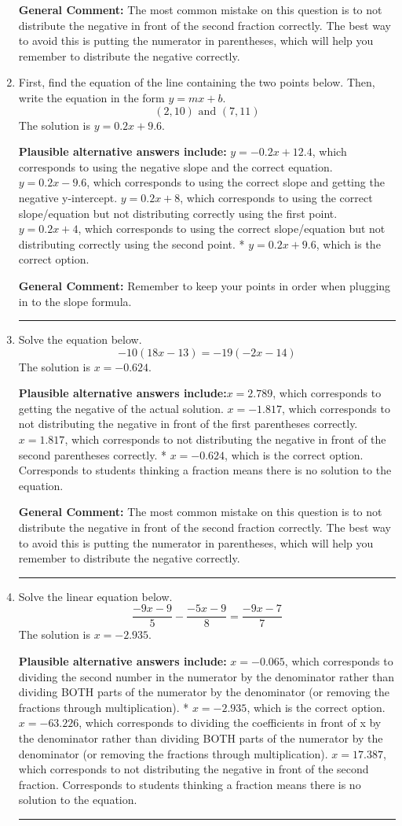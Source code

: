 \documentclass{extbook}[14pt]
\newcommand{\litem}[1]{\item #1

\rule{\textwidth}{0.4pt}}
\begin{document}
\begin{enumerate}
{\textbf{General Comment:} The most common mistake on this question is to not distribute the negative in front of the second fraction correctly. The best way to avoid this is putting the numerator in parentheses, which will help you remember to distribute the negative correctly.
}
\litem{
First, find the equation of the line containing the two points below. Then, write the equation in the form $ y=mx+b $.
\[ (2, 10) \text{ and } (7, 11) \]The solution is \( y = 0.2x + 9.6 \).\begin{enumerate}[label=\Alph*.]
\textbf{Plausible alternative answers include:} $y = -0.2x + 12.4$, which corresponds to using the negative slope and the correct equation.
 $y = 0.2x -9.6$, which corresponds to using the correct slope and getting the negative y-intercept.
 $y = 0.2x + 8$, which corresponds to using the correct slope/equation but not distributing correctly using the first point.
 $y = 0.2x + 4$, which corresponds to using the correct slope/equation but not distributing correctly using the second point.
* $y = 0.2x + 9.6$, which is the correct option.
\end{enumerate}

\textbf{General Comment:} Remember to keep your points in order when plugging in to the slope formula.
}
\litem{
Solve the equation below.
\[ -10(18x -13) = -19(-2x -14) \]The solution is \( x = -0.624 \).\begin{enumerate}[label=\Alph*.]
\textbf{Plausible alternative answers include:}$x = 2.789$, which corresponds to getting the negative of the actual solution.
$x = -1.817$, which corresponds to not distributing the negative in front of the first parentheses correctly.
$x = 1.817$, which corresponds to not distributing the negative in front of the second parentheses correctly.
* $x = -0.624$, which is the correct option.
Corresponds to students thinking a fraction means there is no solution to the equation.
\end{enumerate}

\textbf{General Comment:} The most common mistake on this question is to not distribute the negative in front of the second fraction correctly. The best way to avoid this is putting the numerator in parentheses, which will help you remember to distribute the negative correctly.
}
\litem{
Solve the linear equation below.
\[ \frac{-9x -9}{5} - \frac{-5x -9}{8} = \frac{-9x -7}{7} \]The solution is \( x = -2.935 \).\begin{enumerate}[label=\Alph*.]
\textbf{Plausible alternative answers include:} $x = -0.065$, which corresponds to dividing the second number in the numerator by the denominator rather than dividing BOTH parts of the numerator by the denominator (or removing the fractions through multiplication).
* $x = -2.935$, which is the correct option.
 $x = -63.226$, which corresponds to dividing the coefficients in front of x by the denominator rather than dividing BOTH parts of the numerator by the denominator (or removing the fractions through multiplication).
 $x = 17.387$, which corresponds to not distributing the negative in front of the second fraction.
Corresponds to students thinking a fraction means there is no solution to the equation.
\end{enumerate}

}
\end{enumerate}
\end{document}
